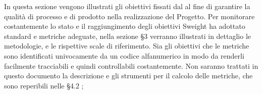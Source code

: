 In questa sezione vengono illustrati gli obiettivi fissati dal \Gruppo al fine di garantire la 
qualità di processo e di prodotto nella realizzazione del Progetto.
Per monitorare costantemente lo stato e il raggiungimento degli obiettivi Sweight
ha adottato standard e metriche adeguate, nella sezione §3 verranno illustrati in
dettaglio le metodologie, e le rispettive scale di riferimento.\newline
Sia gli obiettivi che le metriche sono identificati univocamente da un codice alfanumerico
in modo da renderli facilmente tracciabili e quindi controllabili costantemente.
Non saranno trattati in questo documento la descrizione e gli strumenti per il calcolo delle metriche,
che sono reperibili nelle \NdP \space §4.2 ;




